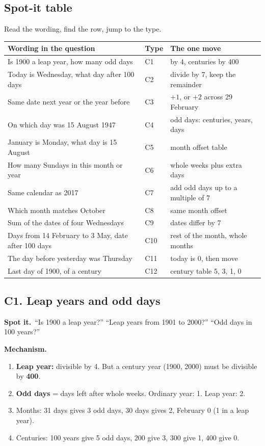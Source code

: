 \documentclass[11pt,a4paper]{article}
\let\oldsubsection\subsection
\renewcommand{\subsection}{\needspace{9\baselineskip}\oldsubsection}
\newcommand{\spot}{\textbf{\color{ember}Spot it.}\ }
\newcommand{\mech}{\textbf{\color{ember}Mechanism.}\ }
\begin{document}
\subsection*{Spot-it table}
Read the wording, find the row, jump to the type.
\begin{center}\small\renewcommand{\arraystretch}{1.18}\setlength{\tabcolsep}{7pt}
\begin{tabularx}{\linewidth}{@{}>{\raggedright\arraybackslash}X l >{\raggedright\arraybackslash}X@{}}
\toprule
\textbf{\color{slate}Wording in the question} & \textbf{\color{slate}Type} & \textbf{\color{slate}The one move} \\ \midrule
Is 1900 a leap year, how many odd days & C1 & by 4, centuries by 400 \\
Today is Wednesday, what day after 100 days & C2 & divide by 7, keep the remainder \\
Same date next year or the year before & C3 & $+1$, or $+2$ across 29 February \\
On which day was 15 August 1947 & C4 & odd days: centuries, years, days \\
1 January is Monday, what day is 15 August & C5 & month offset table \\
How many Sundays in this month or year & C6 & whole weeks plus extra days \\
Same calendar as 2017 & C7 & add odd days up to a multiple of 7 \\
Which month matches October & C8 & same month offset \\
Sum of the dates of four Wednesdays & C9 & dates differ by 7 \\
Days from 14 February to 3 May, date after 100 days & C10 & rest of the month, whole months \\
The day before yesterday was Thursday & C11 & today is 0, then move \\
Last day of 1900, of a century & C12 & century table 5, 3, 1, 0 \\
\bottomrule
\end{tabularx}\end{center}

\subsection{C1. Leap years and odd days}
\spot ``Is 1900 a leap year?'' ``Leap years from 1901 to 2000?'' ``Odd days in 100 years?''

\mech
\begin{enumerate}
\item \textbf{Leap year:} divisible by 4. But a century year (1900, 2000) must be divisible by \textbf{400}.
\item \textbf{Odd days} = days left after whole weeks. Ordinary year: 1. Leap year: 2.
\item Months: 31 days gives 3 odd days, 30 days gives 2, February 0 (1 in a leap year).
\item Centuries: 100 years give 5 odd days, 200 give 3, 300 give 1, 400 give 0.
\end{enumerate}
\end{document}
